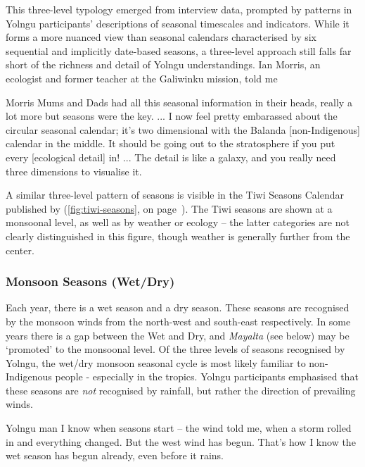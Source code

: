 This three-level typology emerged from interview data, prompted by patterns
in Yolngu participants' descriptions of seasonal timescales and indicators.
While it forms a more nuanced view than seasonal calendars characterised by
six sequential and implicitly date-based seasons, a three-level approach still
falls far short of the richness and detail of Yolngu understandings.
%
Ian Morris, an ecologist and former teacher at the Galiwinku mission, told me
\begin{pquote}{Morris}
    Mums and Dads had all this seasonal information in their heads, really
    a lot more but seasons were the key. ...  I now feel pretty embarassed
    about the circular seasonal calendar; it's two dimensional with the Balanda
    [non-Indigenous] calendar in the middle.  It should be going out to the
    stratosphere if you put every [ecological detail] in! ... The detail is
    like a galaxy, and you really need three dimensions to visualise it.
\end{pquote}

A similar three-level pattern of seasons is visible in the Tiwi Seasons Calendar
published by \citet{CSIROcals} (\cref{fig:tiwi-seasons}, on
page~\pageref{fig:tiwi-seasons}).  The Tiwi seasons are shown at a monsoonal
level, as well as by weather or ecology -- the latter categories are not clearly
distinguished in this figure, though weather is generally further from the center.


\subsubsection{Monsoon Seasons (Wet/Dry)}

Each year, there is a wet season and a dry season.  These seasons are
recognised by the monsoon winds from the north-west and south-east
respectively.  In some years there is a gap between the Wet and Dry, and
\textit{Mayalta} (see below) may be `promoted' to the monsoonal level.
%
Of the three levels of seasons recognised by Yolngu, the wet/dry monsoon
seasonal cycle is most likely familiar to non-Indigenous people - especially
in the tropics.  Yolngu participants emphasised that these seasons are
\emph{not} recognised by rainfall, but rather the direction of prevailing winds.
\begin{pquote}{Yolngu man}
    I know when seasons start -- the wind told me, when a storm rolled in
    and everything changed.  But the west wind has begun.  That's how I
    know the wet season has begun already, even before it rains.
\end{pquote}

